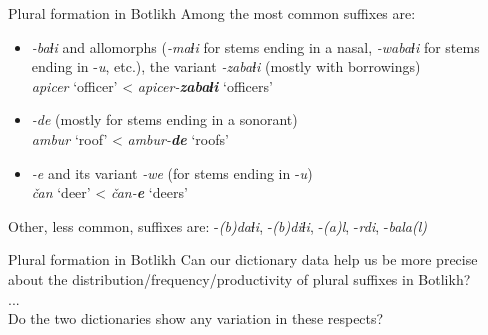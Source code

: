 \begin{frame}{Plural formation in Botlikh}
Among the most common suffixes are:
\begin{itemize}
    \item \textit{-baɬi} and allomorphs (\textit{-maɬi} for stems ending in a nasal, \textit{-wabaɬi} for stems ending in -\textit{u}, etc.), the variant \textit{-zabaɬi} (mostly with borrowings) \\ \textit{apicer} `officer' < \textit{apicer-\textbf{zabaɬi}} `officers'  
    \item \textit{-de} (mostly for stems ending in a sonorant) \\ \textit{ambur} `roof' < \textit{ambur-\textbf{de}} `roofs'
    \item \textit{-e} and its variant \textit{-we} (for stems ending in -\textit{u}) \\ \textit{čan} `deer' < \textit{čan-\textbf{e}} `deers'
\end{itemize}
Other, less common, suffixes are: -\textit{(b)daɬi}, -\textit{(b)diɬi}, -\textit{(a)l}, -\textit{rdi}, -\textit{bala(l)}
\end{frame}

\begin{frame}{Plural formation in Botlikh}
\centering
Can our dictionary data help us be more precise about the distribution/frequency/productivity of plural suffixes in Botlikh? \\ ... \\ Do the two dictionaries show any variation in these respects?
\end{frame}

